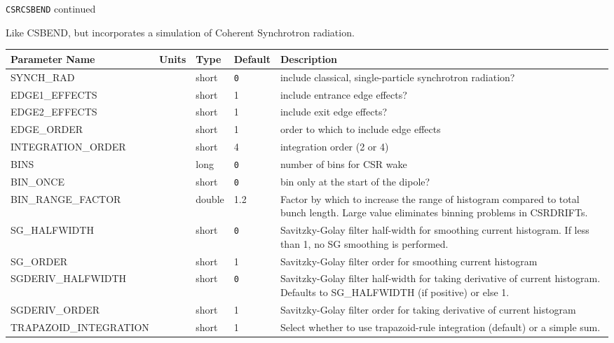 \newpage
\begin{center}{\Large\verb|CSRCSBEND| continued}\end{center}
Like CSBEND, but incorporates a simulation of Coherent Synchrotron radiation.
\\
\begin{tabular}{|l|l|l|l|p{\descwidth}|} \hline
Parameter Name & Units & Type & Default & Description \\ \hline 
SYNCH\_RAD &  & short &  \verb|0| & include classical, single-particle synchrotron radiation?  \\ \hline 
EDGE1\_EFFECTS &  & short &   1               & include entrance edge effects?  \\ \hline 
EDGE2\_EFFECTS &  & short &   1               & include exit edge effects?  \\ \hline 
EDGE\_ORDER &  & short &   1               & order to which to include edge effects  \\ \hline 
INTEGRATION\_ORDER &  & short &   4               & integration order (2 or 4)  \\ \hline 
BINS &  & long &  \verb|0| & number of bins for CSR wake  \\ \hline 
BIN\_ONCE &  & short &  \verb|0| & bin only at the start of the dipole?  \\ \hline 
BIN\_RANGE\_FACTOR &  & double &   1.2 & Factor by which to increase the range of histogram compared to total bunch length.  Large value eliminates binning problems in CSRDRIFTs.  \\ \hline 
SG\_HALFWIDTH &  & short &  \verb|0| & Savitzky-Golay filter half-width for smoothing current histogram.  If less than 1, no SG smoothing is performed.  \\ \hline 
SG\_ORDER &  & short &   1               & Savitzky-Golay filter order for smoothing current histogram  \\ \hline 
SGDERIV\_HALFWIDTH &  & short &  \verb|0| & Savitzky-Golay filter half-width for taking derivative of current histogram.  Defaults to SG\_HALFWIDTH (if positive) or else 1.  \\ \hline 
SGDERIV\_ORDER &  & short &   1               & Savitzky-Golay filter order for taking derivative of current histogram  \\ \hline 
TRAPAZOID\_INTEGRATION &  & short &   1               & Select whether to use trapazoid-rule integration (default) or a simple sum.  \\ \hline 
\end{tabular}

